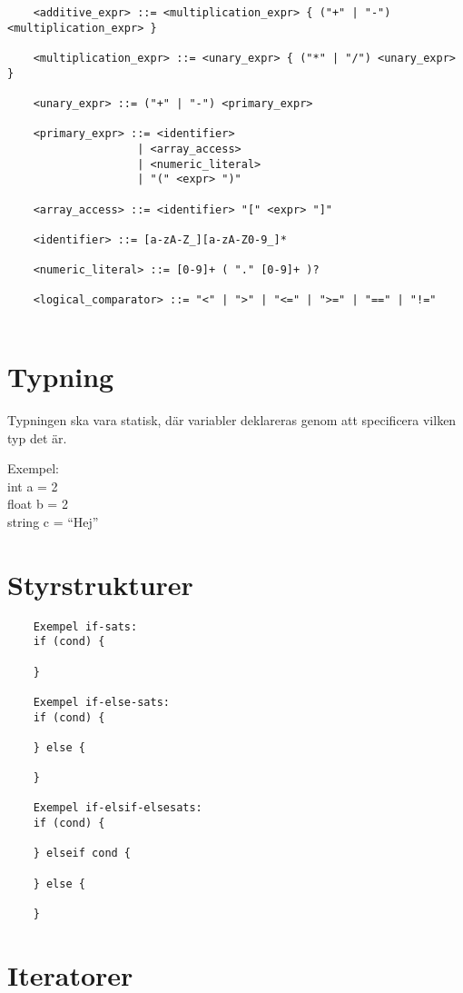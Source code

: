 \documentclass{TDP003mall}
\begin{document}
\begin{verbatim}
    <additive_expr> ::= <multiplication_expr> { ("+" | "-") <multiplication_expr> }

    <multiplication_expr> ::= <unary_expr> { ("*" | "/") <unary_expr> }

    <unary_expr> ::= ("+" | "-") <primary_expr>

    <primary_expr> ::= <identifier> 
                    | <array_access>
                    | <numeric_literal> 
                    | "(" <expr> ")"

    <array_access> ::= <identifier> "[" <expr> "]"

    <identifier> ::= [a-zA-Z_][a-zA-Z0-9_]*

    <numeric_literal> ::= [0-9]+ ( "." [0-9]+ )?

    <logical_comparator> ::= "<" | ">" | "<=" | ">=" | "==" | "!="
    
    \end{verbatim}

    \section{Typning}
    Typningen ska vara statisk, där variabler deklareras genom att specificera vilken typ det är.

    Exempel: \\
    int a = 2 \\
    float b = 2 \\
    string c = ``Hej''

    \section{Styrstrukturer}
\begin{verbatim}
    Exempel if-sats:
    if (cond) {
      
    }

    Exempel if-else-sats:
    if (cond) {
      
    } else {

    }

    Exempel if-elsif-elsesats:
    if (cond) {
      
    } elseif cond {

    } else {

    }
\end{verbatim}

\section{Iteratorer}
\end{document}
